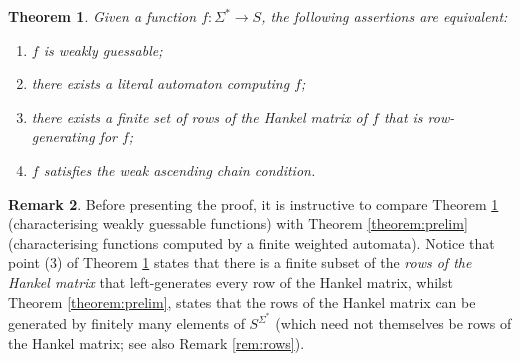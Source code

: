 \documentclass[10pt,a4paper]{amsart}
\newtheorem{thm}{Theorem}[section]
\theoremstyle{definition}
\newtheorem{rem}[thm]{Remark}
\numberwithin{equation}{section}
\numberwithin{theorem}{section}
\begin{document}
\begin{thm}
\label{prop:weakly}
Given a function $f:\Sigma^* \to S$, the following assertions are equivalent:
\begin{enumerate}
\item $f$ is weakly guessable;
\item there exists a literal automaton computing $f$;
\item there exists a finite set of rows of the Hankel matrix of $f$ that is row-generating for $f$;
\item $f$ satisfies the weak ascending chain condition.
\end{enumerate}  
\end{thm}

\begin{rem}
	\label{rem:rows2}
    Before presenting the proof, it is instructive to  compare Theorem \ref{prop:weakly} (characterising weakly guessable functions) with Theorem \ref{theorem:prelim} (characterising functions computed by a finite weighted automata). Notice that point (3) of Theorem \ref{prop:weakly} states that there is a finite subset of the \emph{rows of the Hankel matrix} that left-generates every row of the Hankel matrix, whilst Theorem \ref{theorem:prelim}, states that the rows of the Hankel matrix can be generated by finitely many elements of $S^{\Sigma^*}$ (which need not themselves be rows of the Hankel matrix; see also Remark \ref{rem:rows}).
\end{rem}
\end{document}
